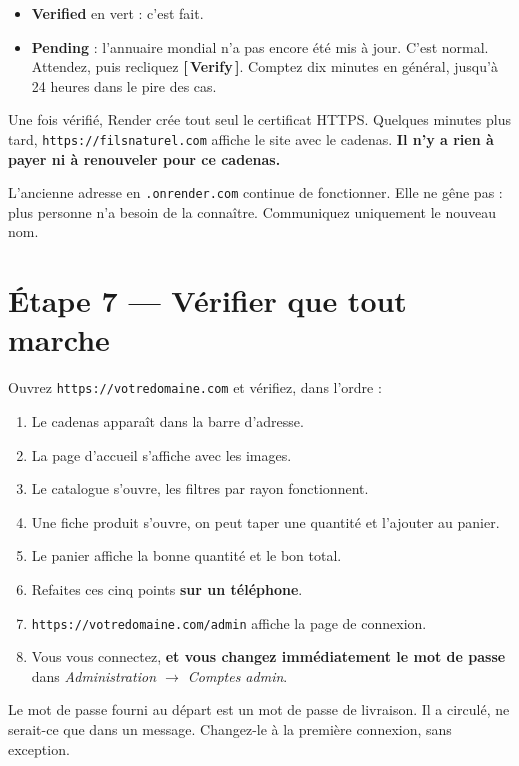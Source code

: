 \documentclass[11pt,a4paper]{article}
\newcommand{\bouton}[1]{\textbf{\textcolor{sig}{[\,#1\,]}}}
\newcommand{\champ}[1]{\textit{#1}}
\newcommand{\saisir}[1]{\texttt{#1}}
\begin{document}
\begin{itemize}
  \item \textbf{Verified} en vert : c'est fait.
  \item \textbf{Pending} : l'annuaire mondial n'a pas encore été mis à jour.
        C'est normal. Attendez, puis recliquez \bouton{Verify}. Comptez dix
        minutes en général, jusqu'à 24 heures dans le pire des cas.
\end{itemize}

Une fois vérifié, Render crée tout seul le certificat HTTPS. Quelques minutes
plus tard, \saisir{https://filsnaturel.com} affiche le site avec le cadenas.
\textbf{Il n'y a rien à payer ni à renouveler pour ce cadenas.}

\begin{conseil}
L'ancienne adresse en \saisir{.onrender.com} continue de fonctionner. Elle ne
gêne pas : plus personne n'a besoin de la connaître. Communiquez uniquement le
nouveau nom.
\end{conseil}

\section{Étape 7 — Vérifier que tout marche}

Ouvrez \saisir{https://votredomaine.com} et vérifiez, dans l'ordre :

\begin{enumerate}
  \item Le cadenas apparaît dans la barre d'adresse.
  \item La page d'accueil s'affiche avec les images.
  \item Le catalogue s'ouvre, les filtres par rayon fonctionnent.
  \item Une fiche produit s'ouvre, on peut taper une quantité et l'ajouter au panier.
  \item Le panier affiche la bonne quantité et le bon total.
  \item Refaites ces cinq points \textbf{sur un téléphone}.
  \item \saisir{https://votredomaine.com/admin} affiche la page de connexion.
  \item Vous vous connectez, \textbf{et vous changez immédiatement le mot de
        passe} dans \champ{Administration $\rightarrow$ Comptes admin}.
\end{enumerate}

\begin{attention}
Le mot de passe fourni au départ est un mot de passe de livraison. Il a
circulé, ne serait-ce que dans un message. Changez-le à la première connexion,
sans exception.
\end{attention}
\end{document}

